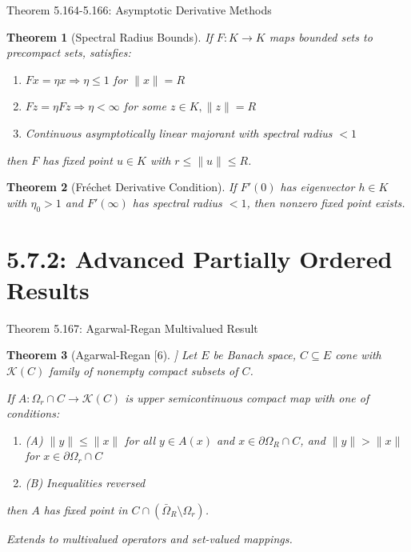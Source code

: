 \documentclass[aspectratio=169,10pt]{beamer}
\theoremstyle{plain}
\newtheorem*{theorem*}{Theorem}
\begin{document}
\begin{frame}{Theorem 5.164-5.166: Asymptotic Derivative Methods}
  \begin{theorem*}[Spectral Radius Bounds]
    If $F: K \to K$ maps bounded sets to precompact sets, satisfies:
    \begin{enumerate}
      \item $Fx = \eta x \Rightarrow \eta \leq 1$ for $\|x\| = R$
      \item $Fz = \eta Fz \Rightarrow \eta < \infty$ for some $z \in K, \|z\| = R$
      \item Continuous asymptotically linear majorant with spectral radius $< 1$
    \end{enumerate}

    then $F$ has fixed point $u \in K$ with $r \leq \|u\| \leq R$.
  \end{theorem*}

  \vspace{1em}

  \begin{theorem*}[Fréchet Derivative Condition]
    If $F'(0)$ has eigenvector $h \in K$ with $\eta_0 > 1$ and $F'(\infty)$ has spectral radius $< 1$,
    then nonzero fixed point exists.
  \end{theorem*}
\end{frame}

\section{5.7.2: Advanced Partially Ordered Results}

\begin{frame}{Theorem 5.167: Agarwal-Regan Multivalued Result}
  \begin{theorem*}[Agarwal-Regan [6]]
    Let $E$ be Banach space, $C \subseteq E$ cone with $\mathcal{K}(C)$ family of nonempty
    compact subsets of $C$.

    If $A: \Omega_r \cap C \to \mathcal{K}(C)$ is upper semicontinuous compact map with
    one of conditions:
    \begin{enumerate}
      \item (A) $\|y\| \leq \|x\|$ for all $y \in A(x)$ and $x \in \partial\Omega_R \cap C$,
              and $\|y\| > \|x\|$ for $x \in \partial\Omega_r \cap C$
      \item (B) Inequalities reversed
    \end{enumerate}

    then $A$ has fixed point in $C \cap (\bar{\Omega}_R \setminus \Omega_r)$.
  \end{theorem*}

  \vspace{0.5em}

  \textit{Extends to multivalued operators and set-valued mappings.}
\end{frame}
\end{document}
